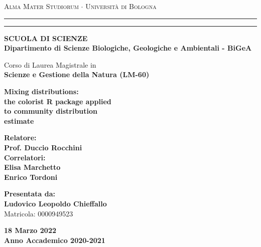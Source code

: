 \documentclass[12pt,a4paper]{article}
\begin{document}

\begin{titlepage}
\begin{center}
{{\Large{\textsc{Alma Mater Studiorum $\cdot$ Universit\`a di
Bologna}}}} \rule[0.1cm]{15.8cm}{0.1mm}
\rule[0.5cm]{15.8cm}{0.6mm}
{\small{\bf SCUOLA DI SCIENZE\\
Dipartimento di Scienze Biologiche, Geologiche e Ambientali - BiGeA }}
\end{center}
\vspace{6mm}
\begin{center}  
    {Corso di Laurea Magistrale in\\
    \bf Scienze e Gestione della Natura (LM-60)}
\end{center}
\vspace{15mm}
\begin{center}
{\LARGE{\bf Mixing distributions:}}\\  
\vspace{3mm}
{\LARGE{\bf the colorist R package applied }}\\
\vspace{3mm}
{\LARGE{\bf to community distribution}}\\
\vspace{3mm}
{\LARGE{\bf estimate}}\\
\end{center}
\vspace{30mm}
\par
\noindent
\begin{minipage}[t]{0.47\textwidth}
{\large{\bf Relatore:\\
Prof. Duccio Rocchini}}\\

{\large{\bf Correlatori:\\
Elisa Marchetto\\ Enrico Tordoni}}
\end{minipage}
\hfill
\begin{minipage}[t]{0.47\textwidth}\raggedleft
{\large{\bf Presentata da:\\
Ludovico Leopoldo Chieffallo}\\
\vspace{3mm}
Matricola: 0000949523}
\end{minipage}
\vspace{20mm}
\begin{center}
{\large{\bf 18 Marzo 2022\\

Anno Accademico 2020-2021 }}
\end{center}
\end{titlepage}
\end{document}
